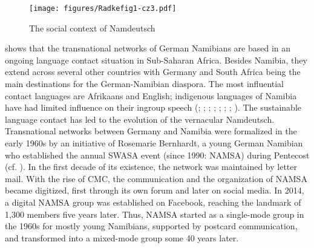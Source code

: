\documentclass[output=paper]{langsci/langscibook}
\begin{document}
\begin{figure}[t]
\texttt{[image: figures/Radkefig1-cz3.pdf]}
\caption{The social context of Namdeutsch}
\label{fig:radke:1}
\end{figure}  

 shows that the transnational networks of German Namibians are based in an ongoing language contact situation in Sub-Saharan Africa. Besides Namibia, they extend across several other countries with Germany and South Africa being the main destinations for the German-Namibian diaspora. The most influential contact languages are Afrikaans and English; indigenous languages of Namibia have had limited influence on their ingroup speech (\citealt{bohm_deutsch_2003}; \citealt{duck_namibia_2018}; \citealt{kellermeier-rehbein_namslang_2015, kellermeier-rehbein_sprache_2016}; \citealt{nockler_sprachmischung_1963}; \citealt{putz_sudwesterdeutsch_1991}; \citealt{wiese_deutsch_2014, wiese_german_2017, wiese_registerdifferenzierung_2021}; \citealt{zimmer_linguisticvar_toappear}; \citealt{zimmer_korpus_2020}). The sustainable language contact has led to the evolution of the vernacular Namdeutsch. Transnational networks between Germany and Namibia were formalized in the early 1960s by an initiative of Rosemarie Bernhardt, a young German Namibian who established the annual SWASA event (since 1990: NAMSA) during Pentecost (cf. \citealt{radke_afrikaans_2019a}). In the first decade of its existence, the network was maintained by letter mail. With the rise of CMC, the communication and the organization of NAMSA became digitized, first through its own forum and later on social media. In 2014, a digital NAMSA group was established on Facebook, reaching the landmark of 1,300 members five years later. Thus, NAMSA started as a single-mode group in the 1960s for mostly young Namibians, supported by postcard communication, and transformed into a mixed-mode group some 40 years later. 
\end{document}
